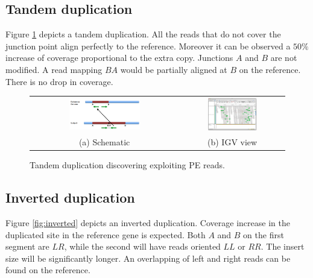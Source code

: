     \subsection{Tandem duplication}
    Figure \ref{fig:tandem} depicts a tandem duplication.
    All the reads that do not cover the junction point align perfectly to the reference.
    Moreover it can be observed a $50\%$ increase of coverage proportional to the extra copy.
    Junctions $A$ and $B$ are not modified.
    A read mapping $BA$ would be partially aligned at $B$ on the reference.
    There is no drop in coverage.


    \begin{figure}[H]
        \begin{tabular}{cc}
            \includegraphics[width=0.5\textwidth]{tandem.png} &   \includegraphics[width=0.5\textwidth]{tandem_igv.png} \\
            (a) Schematic & (b) IGV view \\[6pt]
        \end{tabular}
        \caption{Tandem duplication discovering exploiting PE reads.}
        \label{fig:tandem}
    \end{figure}

    \subsection{Inverted duplication}
    Figure \ref{fig:inverted} depicts an inverted duplication.
    Coverage increase in the duplicated site in the reference gene is expected.
    Both $A$ and $B$ on the first segment are $LR$, while the second will have reads oriented $LL$ or $RR$.
    The insert size will be significantly longer.
    An overlapping of left and right reads can be found on the reference.

